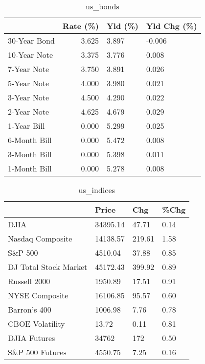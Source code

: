 \documentclass{article}%
\begin{document}
%


\begin{table}[htbp]%
\caption{us\_bonds}%
\centering%
\begin{adjustbox}{width=1\textwidth}%
\begin{tabular}{lrll}
\toprule
             &  Rate (\%) & Yld (\%) & Yld Chg (\%) \\
\midrule
30-Year Bond &     3.625 &   3.897 &      -0.006 \\
10-Year Note &     3.375 &   3.776 &       0.008 \\
 7-Year Note &     3.750 &   3.891 &       0.026 \\
 5-Year Note &     4.000 &   3.980 &       0.021 \\
 3-Year Note &     4.500 &   4.290 &       0.022 \\
 2-Year Note &     4.625 &   4.679 &       0.029 \\
 1-Year Bill &     0.000 &   5.299 &       0.025 \\
6-Month Bill &     0.000 &   5.472 &       0.008 \\
3-Month Bill &     0.000 &   5.398 &       0.011 \\
1-Month Bill &     0.000 &   5.278 &       0.008 \\
\bottomrule
\end{tabular}
%
\end{adjustbox}%
\end{table}

%


\begin{table}[htbp]%
\caption{us\_indices}%
\centering%
\begin{adjustbox}{width=1\textwidth}%
\begin{tabular}{llll}
\toprule
                      &    Price &    Chg & \%Chg \\
\midrule
                 DJIA & 34395.14 &  47.71 & 0.14 \\
     Nasdaq Composite & 14138.57 & 219.61 & 1.58 \\
              S\&P 500 &  4510.04 &  37.88 & 0.85 \\
DJ Total Stock Market & 45172.43 & 399.92 & 0.89 \\
         Russell 2000 &  1950.89 &  17.51 & 0.91 \\
       NYSE Composite & 16106.85 &  95.57 & 0.60 \\
         Barron's 400 &  1006.98 &   7.76 & 0.78 \\
      CBOE Volatility &    13.72 &   0.11 & 0.81 \\
         DJIA Futures &    34762 &    172 & 0.50 \\
      S\&P 500 Futures &  4550.75 &   7.25 & 0.16 \\
\bottomrule
\end{tabular}
%
\end{adjustbox}%
\end{table}
\end{document}
